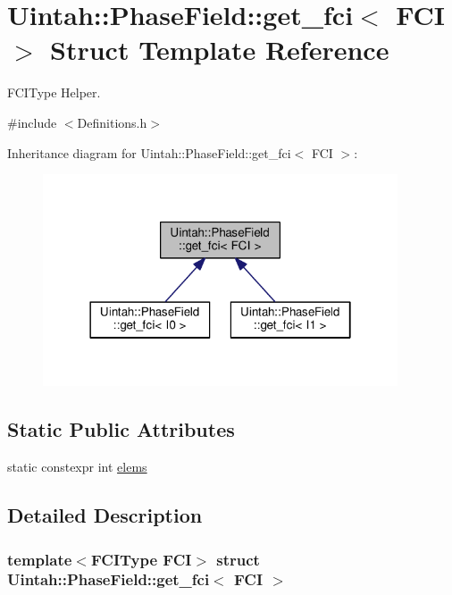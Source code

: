 \hypertarget{structUintah_1_1PhaseField_1_1get__fci}{}\section{Uintah\+:\+:Phase\+Field\+:\+:get\+\_\+fci$<$ F\+CI $>$ Struct Template Reference}
\label{structUintah_1_1PhaseField_1_1get__fci}


F\+C\+I\+Type Helper.  




{\ttfamily \#include $<$Definitions.\+h$>$}



Inheritance diagram for Uintah\+:\+:Phase\+Field\+:\+:get\+\_\+fci$<$ F\+CI $>$\+:\nopagebreak
\begin{figure}[H]
\begin{center}
\leavevmode
\includegraphics[width=298pt]{structUintah_1_1PhaseField_1_1get__fci__inherit__graph}
\end{center}
\end{figure}
\subsection*{Static Public Attributes}
\begin{DoxyCompactItemize}
\item 
static constexpr int \hyperlink{structUintah_1_1PhaseField_1_1get__fci_a8102351252dc32be04622ad879e67cd3}{elems}
\end{DoxyCompactItemize}


\subsection{Detailed Description}
\subsubsection*{template$<$F\+C\+I\+Type F\+CI$>$\newline
struct Uintah\+::\+Phase\+Field\+::get\+\_\+fci$<$ F\+C\+I $>$}

